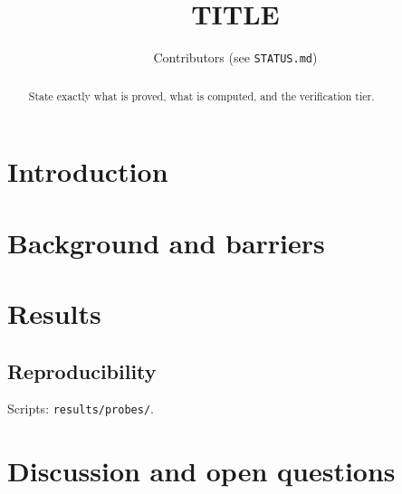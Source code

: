 \documentclass[11pt]{article}
\title{TITLE}
\author{Contributors (see \texttt{STATUS.md})}
\begin{document}
\maketitle
\begin{abstract}
State exactly what is proved, what is computed, and the verification tier.
\end{abstract}
\section{Introduction}
\section{Background and barriers}
\section{Results}
\subsection*{Reproducibility}
Scripts: \texttt{results/probes/}.
\section{Discussion and open questions}
\end{document}
